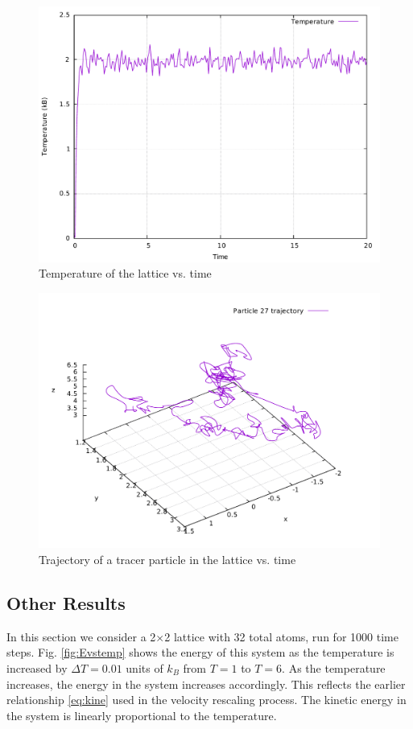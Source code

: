 \documentclass[10pt,a4paper]{article}
\begin{document}
 \begin{figure}
  \centering
  \includegraphics[width=0.6\linewidth]{figs/tempVsTime.pdf}
  \caption{Temperature of the lattice vs. time}
  \label{fig:Tempvst}
 \end{figure}
 
 \begin{figure}[ht!]
  \centering
  \includegraphics[width=0.6\linewidth]{figs/particlePath.pdf}
  \caption{Trajectory of a tracer particle in the lattice vs. time}
  \label{fig:Tracer}
 \end{figure}
 
 \subsection{Other Results}
 In this section we consider a 2$\times$2 lattice with 32 total atoms, run for 1000 time steps. Fig. \ref{fig:Evstemp} shows the energy of this system as the temperature is increased by $\Delta T=0.01$ units of $k_B$ from $T=1$ to $T=6$. As the temperature increases, the energy in the system increases accordingly. This reflects the earlier relationship \eqref{eq:kine} used in the velocity rescaling process. The kinetic energy in the system is linearly proportional to the temperature.
 
\end{document}
